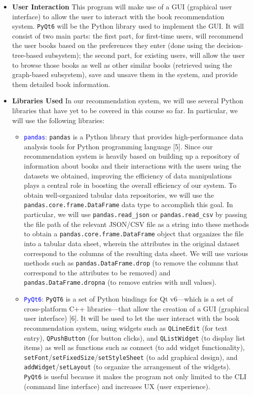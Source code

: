 \documentclass[fontsize=11pt]{article}
\begin{document}
\begin{itemize}
\begin{itemize}
\end{itemize}

\item \textbf{User Interaction }This program will make use of a GUI (graphical user interface) to allow the user to interact with the book recommendation system. \texttt{PyQt6} will be the Python library used to implement the GUI. It will consist of two main parts: the first part, for first-time users, will recommend the user books based on the preferences they enter (done using the decision-tree-based subsystem); the second part, for existing users, will allow the user to browse those books as well as other similar books (retrieved using the graph-based subsystem), save and unsave them in the system, and provide them detailed book information.

\item \textbf{Libraries Used }In our recommendation system, we will use several Python libraries that have yet to be covered in this course so far. In particular, we will use the following libraries:
\begin{itemize}
    \item \textcolor{blue}{\texttt{pandas}}: \texttt{pandas} is a Python library that provides high-performance data analysis tools for Python programming language [5]. Since our recommendation system is heavily based on building up a repository of information about books and their interactions with the users using the datasets we obtained, improving the efficiency of data manipulations plays a central role in boosting the overall efficiency of our system. To obtain well-organized tabular data repositories, we will use the \texttt{pandas.core.frame.DataFrame} data type to accomplish this goal. In particular, we will use \texttt{pandas.read\_json} or \texttt{pandas.read\_csv} by passing the file path of the relevant JSON/CSV file as a string into these methods to obtain a \texttt{pandas.core.frame.DataFrame} object that organizes the file into a tabular data sheet, wherein the attributes in the original dataset correspond to the columns of the resulting data sheet. We will use various methods such as \texttt{pandas.DataFrame.drop} (to remove the columns that correspond to the attributes to be removed) and \texttt{pandas.DataFrame.dropna} (to remove entries with null values).
    \item \textcolor{blue}{\texttt{PyQt6}}: \texttt{PyQT6} is a set of Python bindings for Qt v6—which is a set of cross-platform C++ libraries—that allow the creation of a GUI (graphical user interface) [6]. It will be used to let the user interact with the book recommendation system, using widgets such as \texttt{QLineEdit} (for text entry), \texttt{QPushButton} (for button clicks), and \texttt{QListWidget} (to display list items) as well as functions such as connect (to add widget functionality), \texttt{setFont}/\texttt{setFixedSize}/\texttt{setStyleSheet} (to add graphical design), and \texttt{addWidget}/\texttt{setLayout} (to organize the arrangement of the widgets). \texttt{PyQt6} is useful because it makes the program not only limited to the CLI (command line interface) and increases UX (user experience).

\end{itemize}
\end{itemize}
\end{document}
